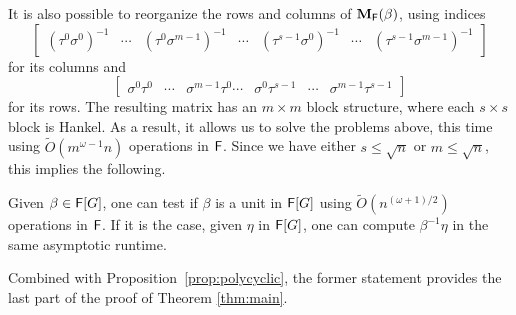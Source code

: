 It is also possible to reorganize the rows and columns of 
 $\mat M_\F(\beta)$, using indices
$$\begin{bmatrix}
(\tau^0 \sigma^0)^{-1} & \cdots & (\tau^0 \sigma^{m-1})^{-1} & \cdots& (\tau^{s-1} \sigma^0)^{-1} & \cdots&  (\tau^{s-1} \sigma^{m-1})^{-1}
\end{bmatrix}$$
for its columns and 
$$\begin{bmatrix}
\sigma^0 \tau^0 &  \cdots & \sigma^{m-1} \tau^0 \cdots& \sigma^0 \tau^{s-1} &  \cdots & \sigma^{m-1} \tau^{s-1}
\end{bmatrix}
$$ for its rows. The resulting matrix has an $m \times m$ block
structure, where each $s\times s$ block is Hankel. As a result, it
allows us to solve the problems above, this time using
$\tilde{O}(m^{\omega-1} n)$ operations in ${\mathsf{F}}$.  Since we have either
$s\le \sqrt n$ or $m \le \sqrt n$, this implies the following.

\begin{proposition}
  Given $\beta \in {\mathsf{F}}[G]$, one can test if $\beta$ is a unit in
  ${\mathsf{F}}[G]$ using $\tilde{O}(n^{(\omega+1)/2})$ operations in ${\mathsf{F}}$.  If
  it is the case, given $\eta$ in ${\mathsf{F}}[G]$, one can compute $\beta^{-1}
  \eta$ in the same asymptotic runtime.
\end{proposition}
Combined with Proposition~\ref{prop:polycyclic}, the former statement
provides the last part of the proof of Theorem \ref{thm:main}.






